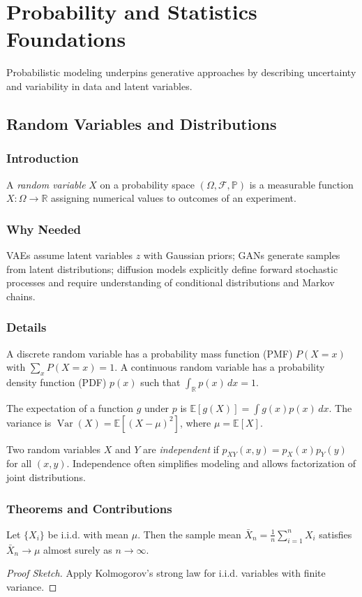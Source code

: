 \chapter{Probability and Statistics Foundations}\label{sec:prob}
Probabilistic modeling underpins generative approaches by describing uncertainty and variability in data and latent variables.

\section{Random Variables and Distributions}
\subsection{Introduction}
A \emph{random variable} $X$ on a probability space $(\Omega,\mathcal{F},\mathbb{P})$ is a measurable function $X:\Omega\to\mathbb{R}$ assigning numerical values to outcomes of an experiment.

\subsection{Why Needed}
VAEs assume latent variables $z$ with Gaussian priors; GANs generate samples from latent distributions; diffusion models explicitly define forward stochastic processes and require understanding of conditional distributions and Markov chains.

\subsection{Details}
A discrete random variable has a probability mass function (PMF) $P(X=x)$ with $\sum_x P(X=x)=1$. A continuous random variable has a probability density function (PDF) $p(x)$ such that $\int_{\mathbb{R}} p(x)\,dx=1$.

The expectation of a function $g$ under $p$ is $\mathbb{E}[g(X)]=\int g(x)p(x)\,dx$. The variance is $\operatorname{Var}(X)=\mathbb{E}[(X-\mu)^2]$, where $\mu=\mathbb{E}[X]$.

Two random variables $X$ and $Y$ are \emph{independent} if $p_{XY}(x,y)=p_X(x)p_Y(y)$ for all $(x,y)$. Independence often simplifies modeling and allows factorization of joint distributions.

\subsection{Theorems and Contributions}
\begin{theorem}
Let $\{X_i\}$ be i.i.d. with mean $\mu$. Then the sample mean $\bar{X}_n=\frac1n\sum_{i=1}^n X_i$ satisfies $\bar{X}_n\to\mu$ almost surely as $n\to\infty$.
\end{theorem}
\begin{proof}[Proof Sketch]
Apply Kolmogorov's strong law for i.i.d. variables with finite variance.
\end{proof}

